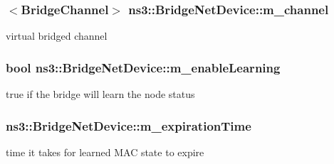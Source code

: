 \subsubsection[{\texorpdfstring{m\+\_\+channel}{m_channel}}]{$<${\bf Bridge\+Channel}$>$ ns3\+::\+Bridge\+Net\+Device\+::m\+\_\+channel\hspace{0.3cm}{\ttfamily [private]}}\hypertarget{classns3_1_1BridgeNetDevice_a091384e0ef3d890c26a26d9681b22986}{}\label{classns3_1_1BridgeNetDevice_a091384e0ef3d890c26a26d9681b22986}


virtual bridged channel 

\subsubsection[{\texorpdfstring{m\+\_\+enable\+Learning}{m_enableLearning}}]{\setlength{\rightskip}{0pt plus 5cm}bool ns3\+::\+Bridge\+Net\+Device\+::m\+\_\+enable\+Learning\hspace{0.3cm}{\ttfamily [private]}}\hypertarget{classns3_1_1BridgeNetDevice_a94b14f30049e8b7fdcd134b620b5996e}{}\label{classns3_1_1BridgeNetDevice_a94b14f30049e8b7fdcd134b620b5996e}


true if the bridge will learn the node status 

\subsubsection[{\texorpdfstring{m\+\_\+expiration\+Time}{m_expirationTime}}]{ ns3\+::\+Bridge\+Net\+Device\+::m\+\_\+expiration\+Time\hspace{0.3cm}{\ttfamily [private]}}\hypertarget{classns3_1_1BridgeNetDevice_a6b6c209fa78de612f218db0dd40b8319}{}\label{classns3_1_1BridgeNetDevice_a6b6c209fa78de612f218db0dd40b8319}


time it takes for learned M\+AC state to expire 

